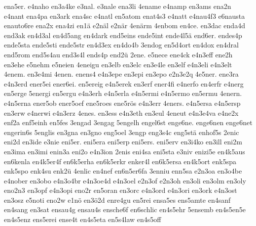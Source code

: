 {    ena5er.
    e4naho
    en3a4ke
    e3nal.
    e3nale
    ena3li
    4ename
    e4namp
    en3ams
    ena2n
    e4nant
    ena4pa
    en3ark
    ena4sc
    e4natl
    en5atom
    enat4s3
    e4natt
    e4nau4f3
    e6nausta
    enauto6re
    ena2x
    ena4zi
    en1ä
    e2näl
    e2när
    4enärm
    4enbom
    en4ce.
    en3dac
    enda4d
    end3ak
    en4d3al
    en4d5ang
    en4dark
    end5eins
    ende5int
    ende4l5ä
    end6er.
    endes4p
    ende5sta
    ende5sti
    ende5str
    en4d3ex
    en4do4b
    3endog
    en5d4ort
    en4dox
    en4dral
    end5rom
    end5s4au
    end3s4l
    ends4p
    end2ü
    2ene.
    e5nece
    ene4ck
    e4n3eff
    ene2h
    en3ehe
    e5nehm
    e5neien
    4eneigu
    en3elb
    en3elc
    en3e4le
    en3elf
    e4n3eli
    e4n3elt
    4enem.
    en3e4mi
    4enen.
    enens4
    e4n3epe
    en3epi
    en3epo
    e2n3e2q
    4e5ner.
    ene3ra
    e4n3erd
    ener5ei
    ener6ei.
    en5ereig
    e4n5erek
    en3erf
    ener4fi
    e4nerfo
    en4erfr
    e4nerg
    en5erge
    5energi
    en5ergu
    e4n3erh
    e4n5erla
    e4n5ermi
    e4n5ermo
    en5ermu
    4enern.
    e4n5erna
    ener5ob
    ener5oef
    ene5roes
    ene5rös
    e4n3err
    4eners.
    e4n5ersa
    e4n5ersp
    en3erw
    e4nerwi
    e4n3erz
    4enes.
    en3ess
    e4n3eth
    en3eul
    4eneut
    e4n3e4va
    e4ne2x
    enf2a
    enf5einh
    en5fes
    3engad
    3engag
    5engelh
    engel6st
    enge6ne.
    enge6nen
    enge6net
    engerin6s
    5englis
    en3gna
    en3gno
    eng5oel
    3engp
    eng3s4c
    eng5stä
    enhof5s
    2enic
    eni2d
    en3ide
    e3nie
    eni5er.
    eni5era
    eni5erp
    eni5ers.
    eni5erv
    en3i4ko
    en3ill
    eni2m
    en3ima
    en3imi
    enin3a
    eni2o
    e4n3ion
    2enis
    eni4sa
    eni5sta
    e3niv
    enizi5e
    en4k5aus
    en6kenla
    en4k5er4f
    en6k5erha
    en6k5erkr
    enker4l
    en6k5ersa
    en4k5ort
    enk5spa
    enk5spo
    enk4su
    enk2ü
    4enlic
    en4nef
    en6n5er6fa
    3enniu
    enn5sa
    e2n3oa
    en3o4be
    e4nober
    en3obo
    e4n3o4br
    e4n3oe4d
    e4n3oel
    e2n3of
    e2n3oh
    en3oli
    en3olm
    en3oly
    eno2n3
    en3opf
    e4n3opi
    eno2r
    en5oran
    en3orc
    e4n3ord
    e4n3ori
    en3ork
    e4n3ost
    en3osz
    e5noti
    eno2w
    e1nö
    en3ö2d
    enre4gu
    en5rei
    ensa5es
    ens5amte
    en4sanf
    en4sang
    en3sat
    ensau4g
    ensau4s
    ensche6f
    en6schlic
    en4s5ehr
    5ensemb
    en4s5en5e
    en4s5enz
    ens5erei
    ense4t
    en4s5eta
    en5s4law
    en4s5off
}
